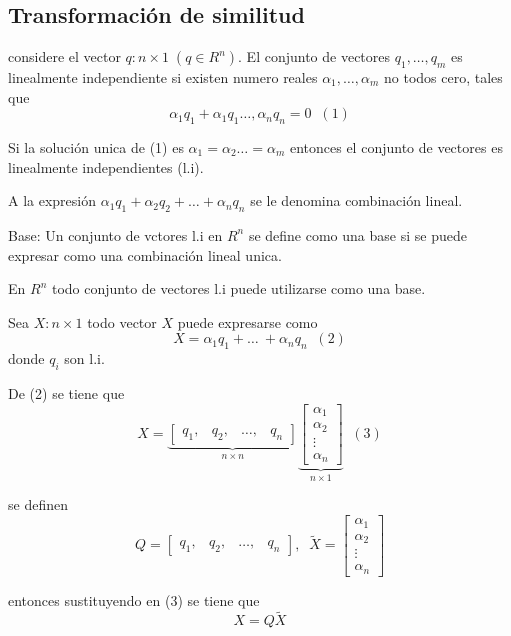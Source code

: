 \subsection{Transformación de similitud}
considere el vector \(q:n\times1\;(q\in R^n)\). El conjunto de vectores \(q_{1}, \ldots, q_{m}\) es linealmente independiente si existen numero reales \(\alpha_{1}, \ldots, \alpha_{m}\) no todos cero, tales que
\[
    \alpha_{1}q_{1} + \alpha_{1}q_{1} \ldots, \alpha_{n}q_{n}=0 \;\; (1)
\]

Si la solución unica de (1) es \(\alpha_{1}=\alpha_{2} \ldots =\alpha_{m}\) entonces el conjunto de vectores es linealmente independientes (l.i).

A la expresión \(\alpha_{1}q_{1}+\alpha_{2}q_{2}+ \ldots +\alpha_{n}q_{n}\) se le denomina combinación lineal.

Base: Un conjunto de vctores l.i en \(R^n\) se define como una base si se puede expresar como una combinación lineal unica.

En \(R^n\) todo conjunto de vectores l.i puede utilizarse como una base.

Sea \(X:n\times1\) todo vector \(X\) puede expresarse como 
\[
    X=\alpha_{1}q_{1}+ \ldots\ +\alpha_{n}q_{n}\;\; (2)
\] 
donde \(q_{i}\) son l.i.

De (2) se tiene que
\[
    X=
    \underbrace{
        \begin{bmatrix}
            q_{1},& q_{2},& \ldots,& q_{n}
        \end{bmatrix}
                }_{n\times n}
    \underbrace{
        \begin{bmatrix}
            \alpha_{1}\\
            \alpha_{2}\\
            \vdots\\
            \alpha_{n}
        \end{bmatrix}
                }_{n\times 1}\;\;(3)
\]

se definen
\[
    Q=
    \begin{bmatrix}
        q_{1},& q_{2},& \ldots,& q_{n}
    \end{bmatrix},\;\;
    \tilde{X}=
    \begin{bmatrix}
        \alpha_{1}\\
        \alpha_{2}\\
        \vdots\\
        \alpha_{n}
    \end{bmatrix}
\]

entonces sustituyendo en (3) se tiene que
\[
    X=Q\tilde{X}
\]

